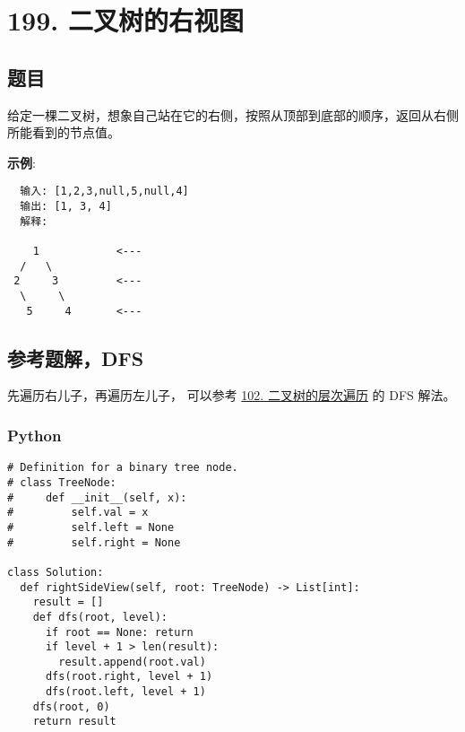 \newpage
\section{199. 二叉树的右视图}
\label{leetcode:199}

\subsection{题目}

给定一棵二叉树，想象自己站在它的右侧，按照从顶部到底部的顺序，返回从右侧所能看到的节点值。

\textbf{示例}:

\begin{verbatim}
  输入: [1,2,3,null,5,null,4]
  输出: [1, 3, 4]
  解释:

    1            <---
  /   \
 2     3         <---
  \     \
   5     4       <---
\end{verbatim}

\subsection{参考题解，DFS}

先遍历右儿子，再遍历左儿子，
可以参考 \hyperref[leetcode:102]{102. 二叉树的层次遍历} 的 DFS 解法。

\subsubsection{Python}

\begin{verbatim}
# Definition for a binary tree node.
# class TreeNode:
#     def __init__(self, x):
#         self.val = x
#         self.left = None
#         self.right = None

class Solution:
  def rightSideView(self, root: TreeNode) -> List[int]:
    result = []
    def dfs(root, level):
      if root == None: return
      if level + 1 > len(result):
        result.append(root.val)
      dfs(root.right, level + 1)
      dfs(root.left, level + 1)
    dfs(root, 0)
    return result
\end{verbatim}
